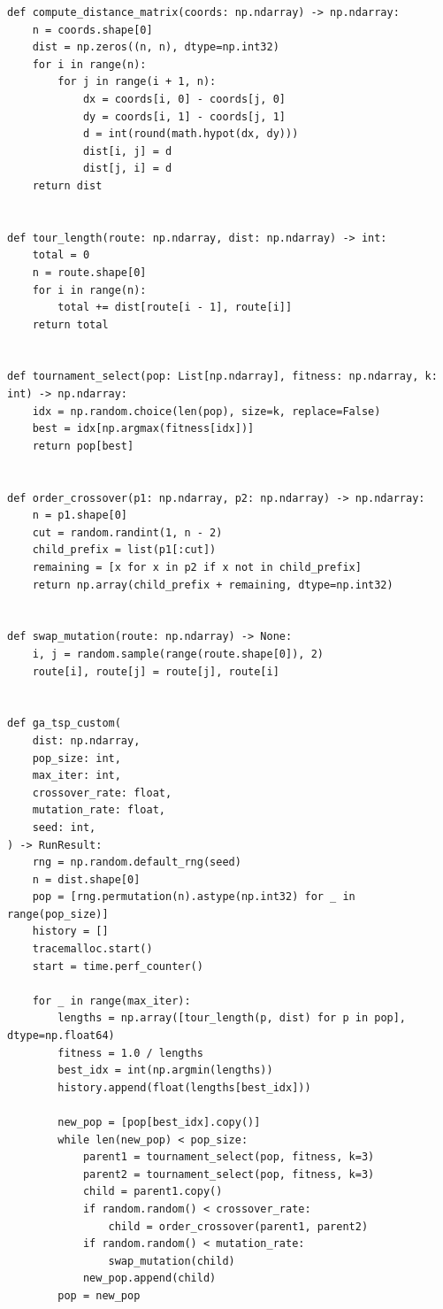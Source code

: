 \documentclass[runningheads]{ctexart}
\begin{document}
\begin{lstlisting}
def compute_distance_matrix(coords: np.ndarray) -> np.ndarray:
    n = coords.shape[0]
    dist = np.zeros((n, n), dtype=np.int32)
    for i in range(n):
        for j in range(i + 1, n):
            dx = coords[i, 0] - coords[j, 0]
            dy = coords[i, 1] - coords[j, 1]
            d = int(round(math.hypot(dx, dy)))
            dist[i, j] = d
            dist[j, i] = d
    return dist


def tour_length(route: np.ndarray, dist: np.ndarray) -> int:
    total = 0
    n = route.shape[0]
    for i in range(n):
        total += dist[route[i - 1], route[i]]
    return total


def tournament_select(pop: List[np.ndarray], fitness: np.ndarray, k: int) -> np.ndarray:
    idx = np.random.choice(len(pop), size=k, replace=False)
    best = idx[np.argmax(fitness[idx])]
    return pop[best]


def order_crossover(p1: np.ndarray, p2: np.ndarray) -> np.ndarray:
    n = p1.shape[0]
    cut = random.randint(1, n - 2)
    child_prefix = list(p1[:cut])
    remaining = [x for x in p2 if x not in child_prefix]
    return np.array(child_prefix + remaining, dtype=np.int32)


def swap_mutation(route: np.ndarray) -> None:
    i, j = random.sample(range(route.shape[0]), 2)
    route[i], route[j] = route[j], route[i]


def ga_tsp_custom(
    dist: np.ndarray,
    pop_size: int,
    max_iter: int,
    crossover_rate: float,
    mutation_rate: float,
    seed: int,
) -> RunResult:
    rng = np.random.default_rng(seed)
    n = dist.shape[0]
    pop = [rng.permutation(n).astype(np.int32) for _ in range(pop_size)]
    history = []
    tracemalloc.start()
    start = time.perf_counter()

    for _ in range(max_iter):
        lengths = np.array([tour_length(p, dist) for p in pop], dtype=np.float64)
        fitness = 1.0 / lengths
        best_idx = int(np.argmin(lengths))
        history.append(float(lengths[best_idx]))

        new_pop = [pop[best_idx].copy()]
        while len(new_pop) < pop_size:
            parent1 = tournament_select(pop, fitness, k=3)
            parent2 = tournament_select(pop, fitness, k=3)
            child = parent1.copy()
            if random.random() < crossover_rate:
                child = order_crossover(parent1, parent2)
            if random.random() < mutation_rate:
                swap_mutation(child)
            new_pop.append(child)
        pop = new_pop


\end{lstlisting}
\end{document}

